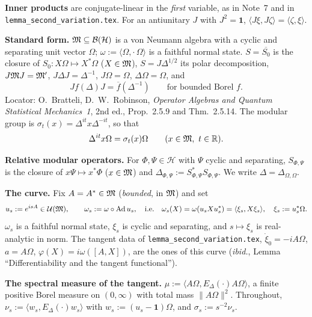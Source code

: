 \documentclass[11pt]{article}
\newcommand{\Hil}{\mathcal H}\newcommand{\Om}{\Omega}
\newcommand{\ip}[2]{\langle#1,#2\rangle}\newcommand{\norm}[1]{\lVert#1\rVert}
\newcommand{\one}{\mathbf 1}\newcommand{\dist}{\operatorname{dist}}
\begin{document}
\textbf{Inner products} are conjugate-linear in the \emph{first} variable, as in Note~7 and in
\texttt{lemma\_second\_variation.tex}.  For an antiunitary $J$ with $J^2=\one$,
$\ip{J\xi}{J\zeta}=\ip{\zeta}{\xi}$.

\textbf{Standard form.}  $\cM\subseteq\cB(\Hil)$ is a von Neumann algebra with a cyclic and separating unit
vector $\Om$; $\omega:=\ip{\Om}{\cdot\,\Om}$ is a faithful normal state.  $S=\overline{S_0}$ is the closure of
$S_0:X\Om\mapsto X^*\Om$ ($X\in\mathfrak M$), $S=J\Delta^{1/2}$ its polar decomposition, $J\mathfrak M J=\mathfrak M'$,
$J\Delta J=\Delta^{-1}$, $J\Om=\Om$, $\Delta\Om=\Om$, and
\begin{equation}\label{eq:Jf}
 Jf(\Delta)J=\overline f(\Delta^{-1})\qquad\text{for bounded Borel }f .
\end{equation}
Locator: O.~Bratteli, D.~W.~Robinson, \emph{Operator Algebras and Quantum Statistical Mechanics~1},
2nd ed., Prop.~2.5.9 and Thm.~2.5.14.  The modular group is
$\sigma_t(x)=\Delta^{it}x\Delta^{-it}$, so that
\begin{equation}\label{eq:sigmaOm}
 \Delta^{it}x\Om=\sigma_t(x)\Om\qquad(x\in\cM,\ t\in\mathbb R).
\end{equation}

\textbf{Relative modular operators.}  For $\Phi,\Psi\in\Hil$ with $\Psi$ cyclic and separating,
$S_{\Phi,\Psi}$ is the closure of $x\Psi\mapsto x^*\Phi$ ($x\in\mathfrak M$) and
$\Delta_{\Phi,\Psi}:=S_{\Phi,\Psi}^*S_{\Phi,\Psi}$.  We write $\Delta=\Delta_{\Om,\Om}$.

\textbf{The curve.}  Fix $A=A^*\in\mathfrak M$ (\emph{bounded}, in $\mathfrak M$) and set
\begin{equation}\label{eq:curve}
 u_s:=e^{isA}\in\cU(\cM),\qquad \omega_s:=\omega\circ\operatorname{Ad}u_s,\quad\text{i.e.}\quad
 \omega_s(X)=\omega(u_sXu_s^*)=\ip{\xi_s}{X\xi_s},\quad \xi_s:=u_s^*\Om .
\end{equation}
$\omega_s$ is a faithful normal state, $\xi_s$ is cyclic and separating, and $s\mapsto\xi_s$ is
real-analytic in norm.  The tangent data of \texttt{lemma\_second\_variation.tex},
$\dot\xi_0=-iA\Om$, $a=A\Om$, $\varphi(X)=i\omega([A,X])$, are the ones of this curve
(\emph{ibid.}, Lemma ``Differentiability and the tangent functional'').

\textbf{The spectral measure of the tangent.}  $\mu:=\ip{A\Om}{E_\Delta(\cdot)A\Om}$, a finite positive
Borel measure on $(0,\infty)$ with total mass $\norm{A\Om}^2$.  Throughout,
$\nu_s:=\ip{w_s}{E_\Delta(\cdot)w_s}$ with $w_s:=(u_s-\one)\Om$, and $\sigma_s:=s^{-2}\nu_s$.
\end{document}
